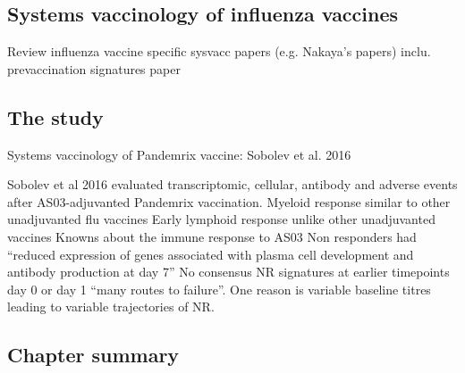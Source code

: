 \subsection{Systems vaccinology of influenza vaccines}

\begin{outline}

\1 Review influenza vaccine specific sysvacc papers (e.g. Nakaya's papers)
    \2 inclu. prevaccination signatures paper

\end{outline}

\subsection{The  study}

\begin{outline}

\1 Systems vaccinology of Pandemrix vaccine: Sobolev et al. 2016

    \2 Sobolev et al 2016 evaluated transcriptomic, cellular, antibody and adverse events after AS03-adjuvanted Pandemrix vaccination.
        \3 Myeloid response similar to other unadjuvanted flu vaccines
        \3 Early lymphoid response unlike other unadjuvanted vaccines
            \4 Knowns about the immune response to AS03
        \3 Non responders had \enquote{reduced expression of genes associated with plasma cell development and antibody production at day 7}
        \3 No consensus NR signatures at earlier timepoints day 0 or day 1 \enquote{many routes to failure}. One reason is variable baseline titres leading to variable trajectories of NR.

\end{outline}

\subsection{Chapter summary}

